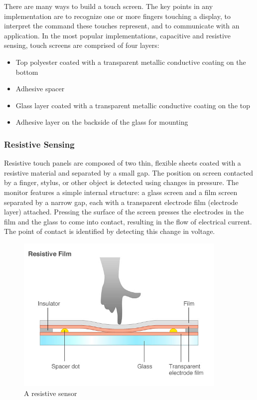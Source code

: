 \documentclass[11pt]{report}
\begin{document}
There are many ways to build a touch screen.
The key points in any implementation are to recognize one or more fingers touching a display, to interpret the command these touches represent, and to communicate with an application.
In the most popular implementations, capacitive and resistive sensing, touch screens are comprised of four layers:

\begin{itemize}
\item Top polyester coated with a transparent metallic conductive coating on the bottom
\item Adhesive spacer
\item Glass layer coated with a transparent metallic conductive coating on the top
\item Adhesive layer on the backside of the glass for mounting
\end{itemize}

\subsubsection{Resistive Sensing}
Resistive touch panels are composed of two thin, flexible sheets coated with a resistive material and separated by a small gap.
The position on screen contacted by a finger, stylus, or other object is detected using changes in pressure. 
The monitor features a simple internal structure: a glass screen and a film screen separated by a narrow gap, each with a transparent electrode film (electrode layer) attached. 
Pressing the surface of the screen presses the electrodes in the film and the glass to come into contact, resulting in the flow of electrical current. 
The point of contact is identified by detecting this change in voltage.

\begin{center}
\begin{figure}
\includegraphics[width=0.9\textwidth]{resistive}
\caption{A resistive sensor}
\end{figure}
\end{center}
\end{document}
